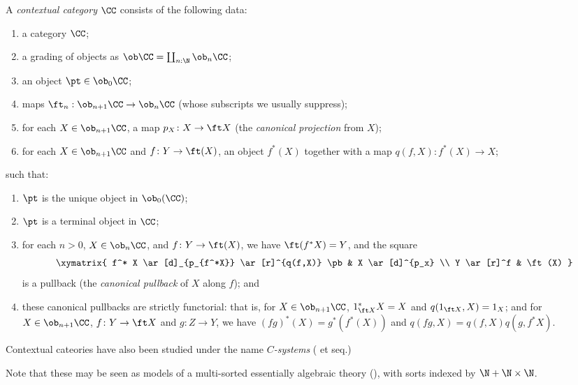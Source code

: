 \begin{definition} \label{def:cxl-cat}
A \emph{contextual category} $\CC$ consists of the following data:
\begin{enumerate}
\item a category $\CC$;
\item a grading of objects as $\ob \CC = \coprod_{n:\N} \ob_n \CC$;
\item an object $\pt \in \ob_0 \CC$;
\item maps $\ft_n : \ob_{n+1} \CC \to \ob_n \CC$ (whose subscripts we usually suppress);
\item for each $X \in \ob_{n+1} \CC$, a map $p_X \colon X \to \ft X$ (the \emph{canonical projection} from $X$);
\item for each $X \in \ob_{n+1} \CC$ and $f \colon Y \to \ft(X)$, an object $f^*(X)$ together with a map $q(f,X) \colon f^*(X) \to X$;
\setcounter{tempcounter}{\theenumi}
\end{enumerate}  
such that:
\begin{enumerate}
\setcounter{enumi}{\thetempcounter}
\item $\pt$ is the unique object in $\ob_0(\CC)$;
\item $\pt$ is a terminal object in $\CC$;
\item for each $n > 0$, $X \in \ob_n \CC$, and $f \colon Y \to \ft(X)$, we have $\ft(f^*X) = Y$, and the square
\[\xymatrix{
  f^* X \ar[d]_{p_{f^*X}} \ar[r]^{q(f,X)} \pb & X \ar[d]^{p_x} \\
  Y                   \ar[r]^f      & \ft (X)
}\]
is a pullback (the \emph{canonical pullback} of $X$ along $f$); and
\item these canonical pullbacks are strictly functorial: that is, for $X \in \ob_{n+1} \CC$, $1_{\ft X}^* X = X$ and $q(1_{\ft X},X) = 1_X$; and for $X \in \ob_{n+1} \CC$, $f \colon Y \to \ft X$ and $g \colon Z \to Y$, we have $(fg)^*(X) = g^*(f^*(X))$ and $q(fg,X) = q(f,X)q(g,f^*X)$.
\end{enumerate}

  Contextual cateories have also been studied under the name \emph{$C$-systems} (\cite{voevodsky:c-system-of-module} et seq.)
\end{definition}

\begin{remark}
  Note that these may be seen as models of a multi-sorted essentially algebraic theory (\cite[3.34]{adamek-rosicky}), with sorts indexed by $\N + \N \times \N$.
\end{remark}

